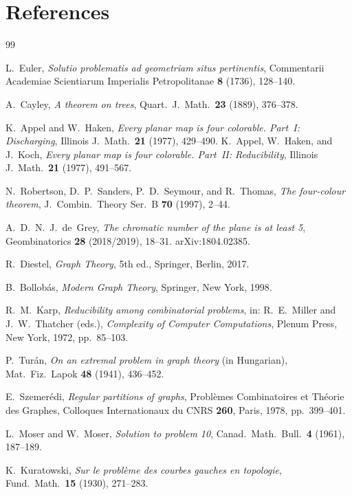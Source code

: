 \documentclass[12pt,a4paper]{amsart}
\theoremstyle{definition}
\theoremstyle{remark}
\begin{document}
\section{References}
\label{sec:references}

\begin{thebibliography}{99}

L.~Euler,
\emph{Solutio problematis ad geometriam situs pertinentis},
Commentarii Academiae Scientiarum Imperialis Petropolitanae \textbf{8} (1736),
128--140.

A.~Cayley,
\emph{A theorem on trees},
Quart.\ J.\ Math.\ \textbf{23} (1889), 376--378.

K.~Appel and W.~Haken,
\emph{Every planar map is four colorable. Part~I: Discharging},
Illinois J.\ Math.\ \textbf{21} (1977), 429--490.
K.~Appel, W.~Haken, and J.~Koch,
\emph{Every planar map is four colorable. Part~II: Reducibility},
Illinois J.\ Math.\ \textbf{21} (1977), 491--567.

N.~Robertson, D.~P.~Sanders, P.~D.~Seymour, and R.~Thomas,
\emph{The four-colour theorem},
J.\ Combin.\ Theory Ser.\ B \textbf{70} (1997), 2--44.

A.~D.~N.~J.\ de~Grey,
\emph{The chromatic number of the plane is at least 5},
Geombinatorics \textbf{28} (2018/2019), 18--31.
arXiv:1804.02385.

R.~Diestel,
\emph{Graph Theory},
5th ed., Springer, Berlin, 2017.

B.~Bollob\'{a}s,
\emph{Modern Graph Theory},
Springer, New York, 1998.

R.~M.~Karp,
\emph{Reducibility among combinatorial problems},
in: R.~E.~Miller and J.~W.~Thatcher (eds.),
\emph{Complexity of Computer Computations},
Plenum Press, New York, 1972, pp.~85--103.

P.~Tur\'{a}n,
\emph{On an extremal problem in graph theory} (in Hungarian),
Mat.\ Fiz.\ Lapok \textbf{48} (1941), 436--452.

E.~Szemer\'{e}di,
\emph{Regular partitions of graphs},
Probl\`{e}mes Combinatoires et Th\'{e}orie des Graphes,
Colloques Internationaux du CNRS \textbf{260}, Paris, 1978, pp.~399--401.

L.~Moser and W.~Moser,
\emph{Solution to problem 10},
Canad.\ Math.\ Bull.\ \textbf{4} (1961), 187--189.

K.~Kuratowski,
\emph{Sur le probl\`{e}me des courbes gauches en topologie},
Fund.\ Math.\ \textbf{15} (1930), 271--283.

\end{thebibliography}
\end{document}
